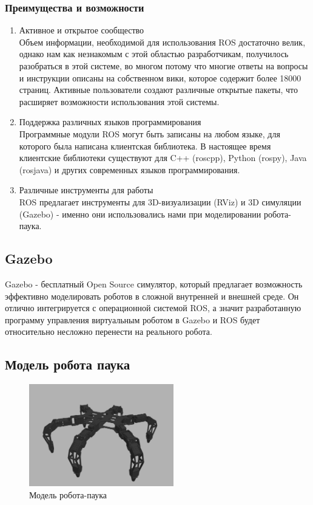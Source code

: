 \documentclass{article}
\begin{document}
\subsubsection{Преимущества и возможности}
\begin{enumerate} 
	\item Активное и открытое сообщество\\
	Объем информации, необходимой для использования ROS достаточно велик, однако нам как незнакомым с этой областью разработчикам, получилось разобраться в этой системе, во многом потому что многие ответы на вопросы и инструкции описаны на собственном вики, которое содержит более 18000 страниц. Активные пользователи создают различные открытые пакеты, что расширяет возможности использования этой системы. 

	\item Поддержка различных языков программирования \\
	Программные модули ROS могут быть записаны на любом языке, для которого была написана клиентская библиотека. В настоящее время клиентские библиотеки существуют для C++ (roscpp), Python (rospy), Java (rosjava) и других современных языков программирования.

	\item Различные инструменты для работы\\
	ROS предлагает инструменты для 3D-визуализации (RViz) и 3D симуляции (Gazebo) - именно они использовались нами при моделировании робота-паука. 

\end{enumerate}

\subsection{Gazebo}
Gazebo - бесплатный Open Source симулятор, который предлагает возможность эффективно моделировать  роботов в сложной внутренней и внешней среде. Он отлично интегрируется с операционной системой ROS, а значит разработанную  программу управления виртуальным роботом в Gazebo и ROS будет относительно несложно перенести на реального робота.

\subsection{Модель робота паука}
\begin{figure}
	\centering
	\includegraphics[height=12em]{spider_model}
	\caption{Модель робота-паука}
\end{figure}
\end{document}
